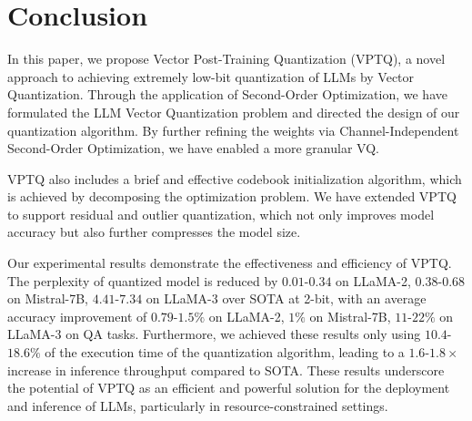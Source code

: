 \section{Conclusion}
\vspace{-0.05in}
In this paper, we propose Vector Post-Training Quantization (VPTQ), a novel approach to achieving extremely low-bit quantization of LLMs by Vector Quantization. 
Through the application of Second-Order Optimization, we have formulated the LLM Vector Quantization problem and directed the design of our quantization algorithm. By further refining the weights via Channel-Independent Second-Order Optimization, we have enabled a more granular VQ. 

VPTQ also includes a brief and effective codebook initialization algorithm, which is achieved by decomposing the optimization problem. We have extended VPTQ to support residual and outlier quantization, which not only improves model accuracy but also further compresses the model size. 

Our experimental results demonstrate the effectiveness and efficiency of VPTQ. 
The perplexity of quantized model is reduced by $0.01$-$0.34$ on LLaMA-2, $0.38$-$0.68$ on Mistral-7B, $4.41$-$7.34$ on LLaMA-3 over SOTA at 2-bit, with an average accuracy improvement of  $0.79$-$1.5\%$ on LLaMA-2, $1\%$ on Mistral-7B, $11$-$22\%$ on LLaMA-3  on QA tasks. 
Furthermore, we achieved these results only using $10.4$-$18.6\%$ of the execution time of the quantization algorithm, leading to a $1.6$-$1.8\times$ increase in inference throughput compared to SOTA. 
These results underscore the potential of VPTQ as an efficient and powerful solution for the deployment and inference of LLMs, particularly in resource-constrained settings.
